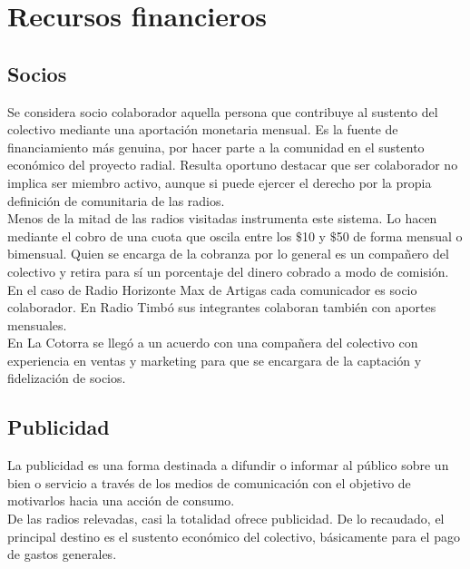 \chapter{Recursos financieros\label{financieros}}

\section{Socios}

Se considera socio colaborador aquella persona que contribuye al sustento del colectivo mediante una aportación monetaria mensual. Es la fuente de financiamiento más genuina, por hacer parte a la comunidad en el sustento económico del proyecto radial. Resulta oportuno destacar que ser colaborador no implica ser miembro activo, aunque si puede ejercer el derecho por la propia definición de comunitaria de las radios.\\

Menos de la mitad de las radios visitadas instrumenta este sistema. Lo hacen mediante el cobro de una cuota que oscila entre los $\$$10 y $\$$50 de forma mensual o bimensual. Quien se encarga de la cobranza por lo general es un compañero del colectivo y retira para sí un porcentaje del dinero cobrado a modo de comisión.\\

En el caso de Radio Horizonte Max de Artigas cada comunicador es socio colaborador. En Radio Timbó sus integrantes colaboran también con aportes mensuales.\\

En La Cotorra se llegó a un acuerdo con una compañera del colectivo con experiencia en ventas y marketing para que se encargara de la captación y fidelización de socios.\\

\section{Publicidad}

La publicidad es una forma destinada a difundir o informar al público sobre un bien o servicio a través de los medios de comunicación con el objetivo de motivarlos hacia una acción de consumo.\\

De las radios relevadas, casi la totalidad ofrece publicidad. De lo recaudado, el principal destino es el sustento económico del colectivo, básicamente para el pago de gastos generales.\\

